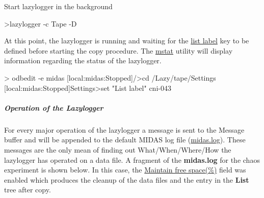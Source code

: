\begin{DoxyEnumerate}
\item Start lazylogger in the background 
\begin{DoxyCode}
>lazylogger -c Tape -D
\end{DoxyCode}
 
\item At this point, the lazylogger is running and waiting for the \hyperlink{F_LogUtil_F_Lazy_list_label}{list label} key to be defined before starting the copy procedure. The \hyperlink{RC_Monitor_RC_mstat_utility}{mstat} utility will display information regarding the status of the lazylogger. 
\begin{DoxyCode}
> odbedit -e midas
[local:midas:Stopped]/>cd /Lazy/tape/Settings
[local:midas:Stopped]Settings>set "List label" cni-043
\end{DoxyCode}


\par


\par



\end{DoxyEnumerate}\hypertarget{F_LogUtil_F_ODB_Lazy_operation}{}\subparagraph{Operation of the Lazylogger}\label{F_LogUtil_F_ODB_Lazy_operation}
For every major operation of the lazylogger a message is sent to the Message buffer and will be appended to the default MIDAS log file (\hyperlink{F_Messaging_F_Log_File}{midas.log}). These messages are the only mean of finding out What/When/Where/How the lazylogger has operated on a data file. A fragment of the {\bfseries midas.log} for the chaos experiment is shown below. In this case, the \hyperlink{F_LogUtil_F_Lazy_maintain_free_space}{Maintain free space(\%)} field was enabled which produces the cleanup of the data files and the entry in the {\bfseries List} tree after copy. 
